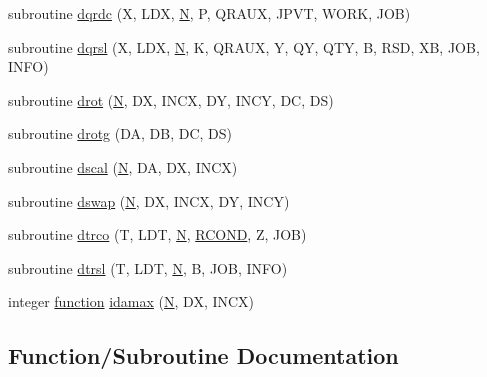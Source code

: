 \begin{DoxyCompactItemize}
\item 
subroutine \hyperlink{d__lpkbls_8f_aafc263cfeae42faf8282dd253b0b0fcc}{dqrdc} (X, L\+D\+X, \hyperlink{polmisc_8c_a0240ac851181b84ac374872dc5434ee4}{N}, P, Q\+R\+A\+U\+X, J\+P\+V\+T, W\+O\+R\+K, J\+O\+B)
\item 
subroutine \hyperlink{d__lpkbls_8f_a2245b8c23b6c0c087877e9eafcfc335c}{dqrsl} (X, L\+D\+X, \hyperlink{polmisc_8c_a0240ac851181b84ac374872dc5434ee4}{N}, K, Q\+R\+A\+U\+X, Y, Q\+Y, Q\+T\+Y, B, R\+S\+D, X\+B, J\+O\+B, I\+N\+F\+O)
\item 
subroutine \hyperlink{d__lpkbls_8f_afc043d68c6e9cec3635dd43547848063}{drot} (\hyperlink{polmisc_8c_a0240ac851181b84ac374872dc5434ee4}{N}, D\+X, I\+N\+C\+X, D\+Y, I\+N\+C\+Y, D\+C, D\+S)
\item 
subroutine \hyperlink{d__lpkbls_8f_a80cdc935deb7657ebd3c89d80420215c}{drotg} (D\+A, D\+B, D\+C, D\+S)
\item 
subroutine \hyperlink{d__lpkbls_8f_a793bdd0739bbd0e0ec8655a0df08981a}{dscal} (\hyperlink{polmisc_8c_a0240ac851181b84ac374872dc5434ee4}{N}, D\+A, D\+X, I\+N\+C\+X)
\item 
subroutine \hyperlink{d__lpkbls_8f_aca2757ba2c3b2c6fc5d729b50345fac0}{dswap} (\hyperlink{polmisc_8c_a0240ac851181b84ac374872dc5434ee4}{N}, D\+X, I\+N\+C\+X, D\+Y, I\+N\+C\+Y)
\item 
subroutine \hyperlink{d__lpkbls_8f_a70f1471a5f449177231eb619d3bf7432}{dtrco} (T, L\+D\+T, \hyperlink{polmisc_8c_a0240ac851181b84ac374872dc5434ee4}{N}, \hyperlink{superlu__enum__consts_8h_af00a42ecad444bbda75cde1b64bd7e72a9b5c151728d8512307565994c89919d5}{R\+C\+O\+N\+D}, Z, J\+O\+B)
\item 
subroutine \hyperlink{d__lpkbls_8f_ad694b01fe416bf39b0ed91201939b017}{dtrsl} (T, L\+D\+T, \hyperlink{polmisc_8c_a0240ac851181b84ac374872dc5434ee4}{N}, B, J\+O\+B, I\+N\+F\+O)
\item 
integer \hyperlink{afunc_8m_a7b5e596df91eadea6c537c0825e894a7}{function} \hyperlink{d__lpkbls_8f_a285793254ff0adaf58c605682efb880c}{idamax} (\hyperlink{polmisc_8c_a0240ac851181b84ac374872dc5434ee4}{N}, D\+X, I\+N\+C\+X)
\end{DoxyCompactItemize}


\subsection{Function/\+Subroutine Documentation}
\hypertarget{d__lpkbls_8f_a7372361a44de0649813750b3280c58cc}{}
